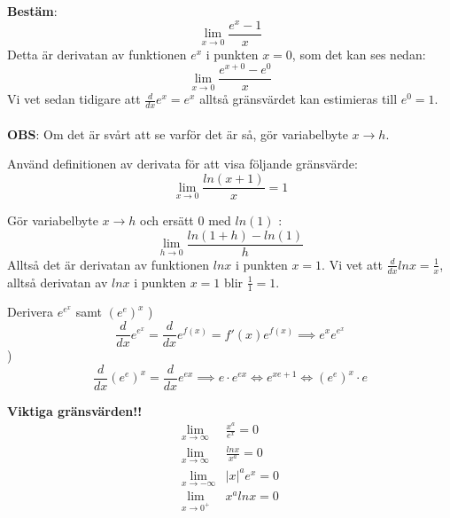 \documentclass{report}
\begin{document}
{
\textbf{Bestäm}:
\begin{equation*}
	\lim_{x \to 0} \frac{e^x-1}{x}  
\end{equation*}
Detta är derivatan av funktionen $ e^x $ i punkten $ x=0 $, som det kan ses nedan:
\begin{equation*}
	\lim_{x \to 0} \frac{e^{x+0}-e^0}{x} 
\end{equation*}
Vi vet sedan tidigare att $ \frac{d}{dx} e^x = e^x $ alltså gränsvärdet kan estimieras till $ e^0 = 1 $.\\\\

\textbf{OBS}: Om det är svårt att se varför det är så, gör variabelbyte $ x \to h $. 
}

\vspace{30pt}
\qs{}
{
Använd definitionen av derivata för att visa följande gränsvärde:
\begin{equation*}
\lim_{x \to 0} \frac{ln(x+1)}{x} = 1
\end{equation*}
}

\sol Gör variabelbyte $ x \to h $ och ersätt $ 0 $ med $ ln(1) $ :
\begin{equation*}
\lim_{h \to 0} \frac{ln(1+h)-ln(1)}{h} 
\end{equation*}
Alltså det är derivatan av funktionen $ lnx $ i punkten $ x=1 $. Vi vet att $ \frac{d}{dx} lnx = \frac{1}{x} $, alltså derivatan av $ lnx $ i punkten $ x = 1 $ blir $ \frac{1}{1} = 1 $.

	\vspace{20pt}
\qs{}
{
	Derivera $ e^{e^x} $ samt $ (e^e)^x $
}
)
\begin{equation*}
	\frac{d}{dx} e^{e^x} = \frac{d}{dx} e^{f(x)} = f'(x) e^{f(x)} \implies e^x e^{e^x} 
\end{equation*}
)
\begin{equation*}
	\frac{d}{dx} (e^e)^x = \frac{d}{dx} e^{ex} \implies e \cdot e^{ex} \iff e^{xe+1} \iff (e^e)^x \cdot e
\end{equation*}

\noindent
\textbf{Viktiga gränsvärden!!} 
\begin{align}
	\lim_{x \to \infty} & \frac{x^a}{e^x} = 0\\
	\lim_{x \to \infty} & \frac{lnx}{x^a} = 0\\
	\lim_{x \to - \infty} & |x|^a e^x = 0\\
	\lim_{x \to 0^+} & x^a lnx = 0
\end{align}
\end{document}
